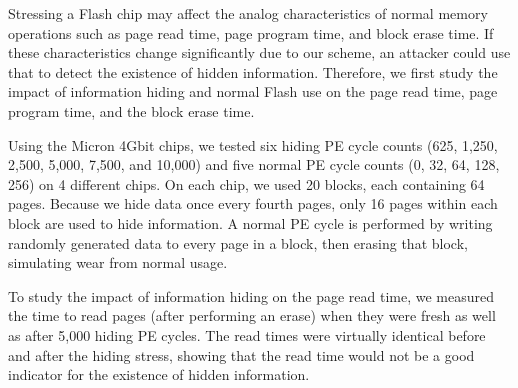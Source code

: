 


Stressing a Flash chip may affect the analog characteristics
of normal memory operations such as page read time, page program time, 
and block erase time. 
If these characteristics change significantly due to our scheme,
an attacker could use that to detect the existence of hidden 
information. Therefore, we first study the impact of information 
hiding and normal Flash use on the page read time, page program time, 
and the block erase time.

Using the Micron 4Gbit chips, we tested six hiding PE cycle counts 
(625, 1,250, 2,500, 5,000, 7,500, and 10,000) and five normal PE 
cycle counts (0, 32, 64, 128, 256) on 4 different chips. On each chip,
we used 20 blocks, 
each containing 64 pages. Because we hide data once every fourth pages, 
only 16 pages within each block are used to hide information.
A normal PE cycle is performed by writing randomly generated data 
to every page in a block, then erasing that block, simulating
wear from normal usage.

To study the impact of information hiding on the page read time,
we measured the time to read pages (after performing
an erase) when they were fresh as well as after 5,000 hiding PE cycles. 
The read times were virtually identical before and after the hiding
stress, showing that the read time would not be a good indicator for 
the existence of hidden information.


